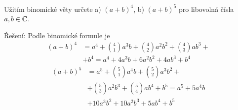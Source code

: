 \begin{mdframed}[style=mdexam]
  \begin{example}\label{mai:exam106a}
    Užitím binomické věty určete a) \((a+b)^4\), b) \((a+b)^5\) pro libovolná čísla
    \(a,b\in\mathbb{C}\). \cite[s.~299]{polak1991matematika}\newline

    Řešení: Podle binomické formule je
    \begin{align*}
      (a+b)^4 &= a^4 + \binom{4}{1}a^3b + \binom{4}{2}a^2b^2 + \binom{4}{3}ab^3 + \\
              &+ b^4 = a^4 + 4a^3b + 6a^2b^2 + 4ab^3 + b^4
    \end{align*}
    \begin{align*}
      (a+b)^5 &= a^5 + \binom{5}{1}a^4b + \binom{5}{2}a^3b^2 +                  \\ 
              &+ \binom{5}{3}a^2b^3  +    \binom{5}{4}ab^4 + b^5 = a^5 + 5a^4b  \\
              &+ 10a^3b^2 + 10a^2b^3 + 5ab^4 + b^5
    \end{align*}
  \end{example}  
\end{mdframed}